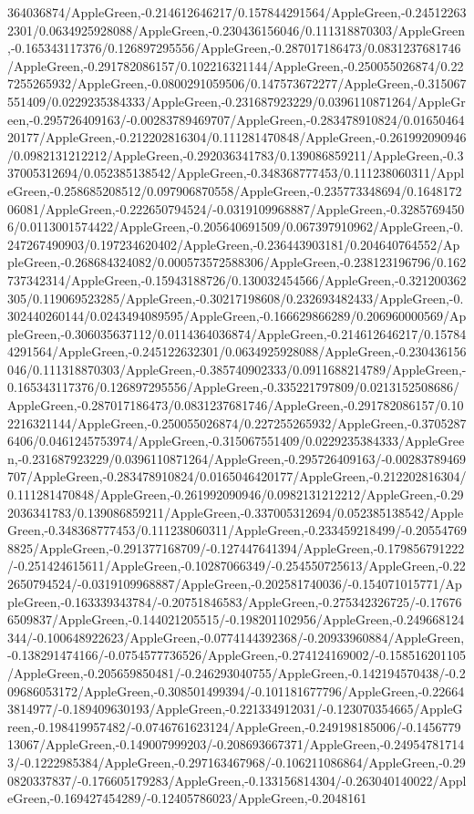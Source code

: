 {\begin{tikzternal}
{364036874/AppleGreen,-0.214612646217/0.157844291564/AppleGreen,-0.245122632301/0.0634925928088/AppleGreen,-0.230436156046/0.111318870303/AppleGreen,-0.165343117376/0.126897295556/AppleGreen,-0.287017186473/0.0831237681746/AppleGreen,-0.291782086157/0.102216321144/AppleGreen,-0.250055026874/0.227255265932/AppleGreen,-0.0800291059506/0.147573672277/AppleGreen,-0.315067551409/0.0229235384333/AppleGreen,-0.231687923229/0.0396110871264/AppleGreen,-0.295726409163/-0.00283789469707/AppleGreen,-0.283478910824/0.0165046420177/AppleGreen,-0.212202816304/0.111281470848/AppleGreen,-0.261992090946/0.0982131212212/AppleGreen,-0.292036341783/0.139086859211/AppleGreen,-0.337005312694/0.052385138542/AppleGreen,-0.348368777453/0.111238060311/AppleGreen,-0.258685208512/0.097906870558/AppleGreen,-0.235773348694/0.164817206081/AppleGreen,-0.222650794524/-0.0319109968887/AppleGreen,-0.32857694506/0.0113001574422/AppleGreen,-0.205640691509/0.067397910962/AppleGreen,-0.247267490903/0.197234620402/AppleGreen,-0.236443903181/0.204640764552/AppleGreen,-0.268684324082/0.000573572588306/AppleGreen,-0.238123196796/0.162737342314/AppleGreen,-0.15943188726/0.130032454566/AppleGreen,-0.321200362305/0.119069523285/AppleGreen,-0.30217198608/0.232693482433/AppleGreen,-0.302440260144/0.0243494089595/AppleGreen,-0.166629866289/0.206960000569/AppleGreen,-0.306035637112/0.0114364036874/AppleGreen,-0.214612646217/0.157844291564/AppleGreen,-0.245122632301/0.0634925928088/AppleGreen,-0.230436156046/0.111318870303/AppleGreen,-0.385740902333/0.0911688214789/AppleGreen,-0.165343117376/0.126897295556/AppleGreen,-0.335221797809/0.0213152508686/AppleGreen,-0.287017186473/0.0831237681746/AppleGreen,-0.291782086157/0.102216321144/AppleGreen,-0.250055026874/0.227255265932/AppleGreen,-0.37052876406/0.0461245753974/AppleGreen,-0.315067551409/0.0229235384333/AppleGreen,-0.231687923229/0.0396110871264/AppleGreen,-0.295726409163/-0.00283789469707/AppleGreen,-0.283478910824/0.0165046420177/AppleGreen,-0.212202816304/0.111281470848/AppleGreen,-0.261992090946/0.0982131212212/AppleGreen,-0.292036341783/0.139086859211/AppleGreen,-0.337005312694/0.052385138542/AppleGreen,-0.348368777453/0.111238060311/AppleGreen,-0.233459218499/-0.205547698825/AppleGreen,-0.291377168709/-0.127447641394/AppleGreen,-0.179856791222/-0.251424615611/AppleGreen,-0.10287066349/-0.254550725613/AppleGreen,-0.222650794524/-0.0319109968887/AppleGreen,-0.202581740036/-0.154071015771/AppleGreen,-0.163339343784/-0.20751846583/AppleGreen,-0.275342326725/-0.176766509837/AppleGreen,-0.144021205515/-0.198201102956/AppleGreen,-0.249668124344/-0.100648922623/AppleGreen,-0.0774144392368/-0.20933960884/AppleGreen,-0.138291474166/-0.0754577736526/AppleGreen,-0.274124169002/-0.158516201105/AppleGreen,-0.205659850481/-0.246293040755/AppleGreen,-0.142194570438/-0.209686053172/AppleGreen,-0.308501499394/-0.101181677796/AppleGreen,-0.226643814977/-0.189409630193/AppleGreen,-0.221334912031/-0.123070354665/AppleGreen,-0.198419957482/-0.0746761623124/AppleGreen,-0.249198185006/-0.145677913067/AppleGreen,-0.149007999203/-0.208693667371/AppleGreen,-0.249547817143/-0.1222985384/AppleGreen,-0.297163467968/-0.106211086864/AppleGreen,-0.290820337837/-0.176605179283/AppleGreen,-0.133156814304/-0.263040140022/AppleGreen,-0.169427454289/-0.12405786023/AppleGreen,-0.2048161}
\end{tikzternal}}

